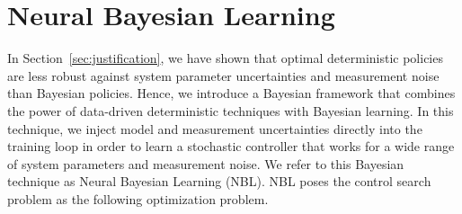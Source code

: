 
\section{Neural Bayesian Learning}

In Section~\ref{sec:justification}, we have shown that optimal deterministic
policies are less robust against system parameter uncertainties and measurement
noise than Bayesian policies. Hence, we introduce a Bayesian framework that
combines the power of data-driven deterministic techniques with Bayesian
learning. In this technique, we inject model and measurement uncertainties
directly into the training loop in order to learn a stochastic controller that
works for a wide range of system parameters and measurement noise. We refer to
this Bayesian technique as Neural Bayesian Learning (NBL). NBL poses the control
search problem as the following optimization problem.

